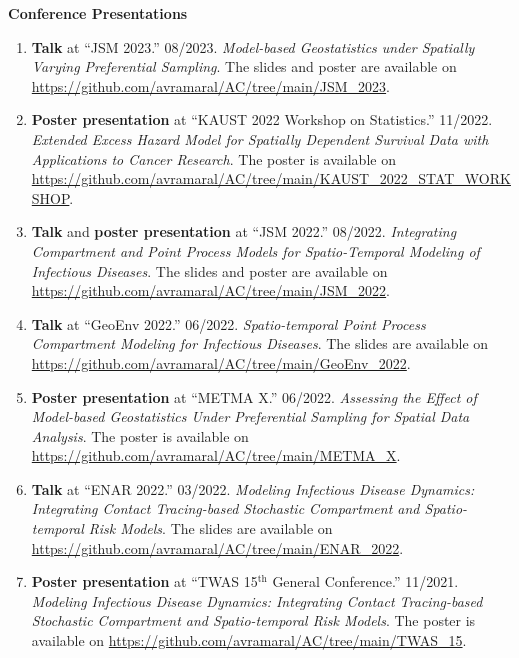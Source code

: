 \documentclass[11pt, ]{article}
\begin{document}
	\vspace{6pt}
	
	{\Large \textbf{Conference Presentations}}
	
	\begin{enumerate}
		\item \textbf{Talk} at ``JSM 2023.'' 08/2023. \textit{Model-based Geostatistics under Spatially Varying Preferential Sampling}. The slides and poster are available on \href{https://github.com/avramaral/AC/tree/main/JSM\_2023}{\url{https://github.com/avramaral/AC/tree/main/JSM\_2023}}.
		
		\item \textbf{Poster presentation} at ``KAUST 2022 Workshop on Statistics.'' 11/2022. \textit{Extended Excess Hazard Model for Spatially Dependent Survival Data with Applications to Cancer Research}. The poster is available on \href{https://github.com/avramaral/AC/tree/main/KAUST_2022_STAT_WORKSHOP}{\url{https://github.com/avramaral/AC/tree/main/KAUST_2022_STAT_WORKSHOP}}.
		
		\item \textbf{Talk} and \textbf{poster presentation} at ``JSM 2022.'' 08/2022. \textit{Integrating Compartment and Point Process Models for Spatio-Temporal Modeling of Infectious Diseases}. The slides and poster are available on \href{https://github.com/avramaral/AC/tree/main/JSM\_2022}{\url{https://github.com/avramaral/AC/tree/main/JSM\_2022}}.
		
		\item \textbf{Talk} at ``GeoEnv 2022.'' 06/2022. \textit{Spatio-temporal Point Process Compartment Modeling for Infectious Diseases}. The slides are available on \href{https://github.com/avramaral/AC/tree/main/GeoEnv\_2022}{\url{https://github.com/avramaral/AC/tree/main/GeoEnv\_2022}}.
		
		\item \textbf{Poster presentation} at ``METMA X.'' 06/2022. \textit{Assessing the Effect of Model-based Geostatistics Under Preferential Sampling for Spatial Data Analysis}. The poster is available on \href{https://github.com/avramaral/AC/tree/main/METMA\_X}{\url{https://github.com/avramaral/AC/tree/main/METMA\_X}}.
		
		\item \textbf{Talk} at ``ENAR 2022.'' 03/2022. \textit{Modeling Infectious Disease Dynamics: Integrating Contact Tracing-based	Stochastic Compartment and Spatio-temporal Risk Models}. The slides are available on \href{https://github.com/avramaral/AC/tree/main/ENAR\_2022}{\url{https://github.com/avramaral/AC/tree/main/ENAR\_2022}}.
		
		\item \textbf{Poster presentation} at ``TWAS 15${}^{\text{th}}$ General Conference.'' 11/2021. \textit{Modeling Infectious Disease Dynamics: Integrating Contact Tracing-based	Stochastic Compartment and Spatio-temporal Risk Models}. The poster is available on \href{https://github.com/avramaral/AC/tree/main/TWAS\_15}{\url{https://github.com/avramaral/AC/tree/main/TWAS\_15}}.
	\end{enumerate}
	
\end{document}
